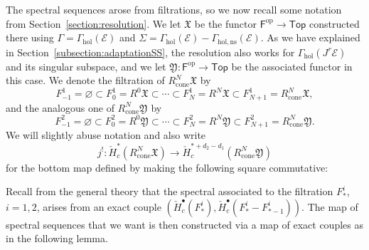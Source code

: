 \documentclass[a4paper]{amsart}
\newcommand{\cE}{\mathcal E}
\newcommand{\fX}{\mathfrak X}
\newcommand{\fY}{\mathfrak Y}
\newcommand{\op}{\text{op}}
\theoremstyle{plain}
\theoremstyle{definition}
\newcommand{\catTop}{\mathsf{Top}}
\newcommand{\catF}{\mathsf{F}}
\newcommand{\CCH}{\check{H}_{c}}
\let\emptyset\varnothing
\newcommand{\Gammahol}{\Gamma_{\mathrm{hol}}}
\begin{document}
The spectral sequences arose from filtrations, so we now recall some notation from Section~\ref{section:resolution}. We let $\fX$ be the functor $\catF^\op \to \catTop$ constructed there using $\Gamma = \Gammahol(\cE)$ and $\Sigma = \Gammahol(\cE) - \Gamma_{\mathrm{hol,ns}}(\cE)$. As we have explained in Section~\ref{subsection:adaptationSS}, the resolution also works for $\Gammahol(J^r\cE)$ and its singular subspace, and we let $\fY \colon \catF^\op \to \catTop$ be the associated functor in this case. We denote the filtration of $R^N_\text{cone}\fX$ by
\[
    F_{-1}^1 = \emptyset \subset F_0^1 = R^0\fX \subset \cdots \subset F_N^1 = R^N\fX \subset F_{N+1}^1 = R^N_\text{cone}\fX,
\]
and the analogous one of $R^N_\text{cone}\fY$ by
\begin{equation}\label{eqn:filtrationFrakY}
    F_{-1}^2 = \emptyset \subset F_0^2 = R^0\fY \subset \cdots \subset F_N^2 = R^N\fY \subset F_{N+1}^2 = R^N_\text{cone}\fY.
\end{equation}
We will slightly abuse notation and also write
\begin{equation}\label{eqn:shriekmapRNcone}
    j^! \colon \CCH^*(R^N_\text{cone}\fX) \to \CCH^{*+d_2-d_1}(R^N_\text{cone}\fY)
\end{equation}
for the bottom map defined by making the following square commutative:
\begin{center}
\end{center}
Recall from the general theory that the spectral associated to the filtration $F_*^i$, $i=1,2$, arises from an exact couple $(\CCH^\bullet(F_*^i), \CCH^\bullet(F_*^i - F_{*-1}^i))$. The map of spectral sequences that we want is then constructed via a map of exact couples as in the following lemma.
\end{document}
